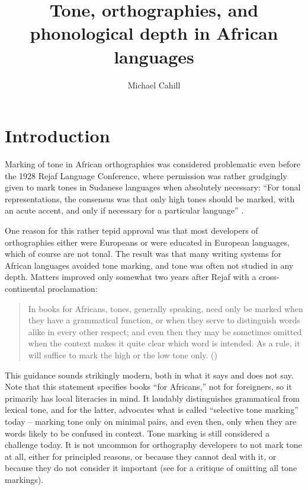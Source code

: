 \documentclass[output=paper]{langscibook}
\title{Tone, orthographies, and phonological depth in African languages}
\author{Michael Cahill\affiliation{SIL international}}
\begin{document}
\maketitle

\section{Introduction}\label{sec:Introduction:1}

Marking of tone in African orthographies was considered problematic even before the 1928 Rejaf Language Conference, where permission was rather grudgingly given to mark tones in Sudanese languages when absolutely necessary: “For tonal representations, the consensus was that only high tones should be marked, with an acute accent, and only if necessary for a particular language” \citep{Miner2003}.

One reason for this rather tepid approval was that most developers of orthographies either were Europeans or were educated in European languages, which of course are not tonal. The result was that many writing systems for African languages avoided tone marking, and tone was often not studied in any depth. Matters improved only somewhat two years after Rejaf with a cross-continental proclamation: 

\begin{quote}
In books for Africans, tones, generally speaking, need only be marked when they have a grammatical function, or when they serve to distinguish words alike in every other respect; and even then they may be sometimes omitted when the context makes it quite clear which word is intended. As a rule, it will suffice to mark the high or the low tone only. (\citealt[14, referring to Rejaf and 12 other documents]{IIALC1930})
\end{quote}

This guidance sounds strikingly modern, both in what it says and does not say. Note that this statement specifies books “for Africans,” not for foreigners, so it primarily has local literacies in mind. It laudably distinguishes grammatical from lexical tone, and for the latter, advocates what is called “selective tone marking” today -- marking tone only on minimal pairs, and even then, only when they are words likely to be confused in context. Tone marking is still considered a challenge today. It is not uncommon for orthography developers to not mark tone at all, either for principled reasons, or because they cannot deal with it, or because they do not consider it important (see \citealt{Cahill2000} for a critique of omitting all tone markings).
\end{document}
